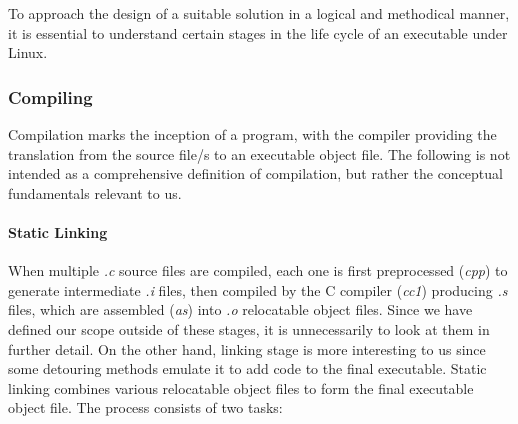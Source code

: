 To approach the design of a suitable solution in a logical and methodical manner, it is essential to understand certain stages in the life cycle of an executable under Linux. 

\subsubsection{Compiling}
Compilation marks the inception of a program, with the compiler providing the translation from the source file/s to an executable object file. The following is not intended as a comprehensive definition of compilation, but rather the conceptual fundamentals relevant to us.

\paragraph{Static Linking}
When multiple \emph{.c} source files are compiled, each one is first preprocessed (\emph{cpp}) to generate intermediate \emph{.i} files, then compiled by the C compiler (\emph{cc1}) producing \emph{.s} files, which are assembled (\emph{as}) into \emph{.o} relocatable object files. Since we have defined our scope outside of these stages, it is unnecessarily to look at them in further detail. On the other hand, linking stage is more interesting to us since some detouring methods emulate it to add code to the final executable. Static linking combines various relocatable object files to form the final executable object file. The process consists of two tasks\cite{computer_systems}:

